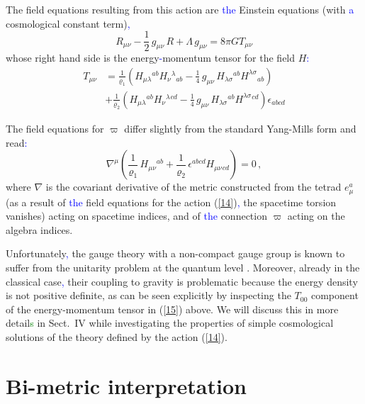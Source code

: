 \documentclass[prd,reprint,eqsecnum,nofootinbib]{revtex4-1}
\begin{document}
The field equations resulting from this action are \textcolor{blue}{the} Einstein
equations (with \textcolor{blue}{a} cosmological constant term)\textcolor{blue}{,}
\begin{equation}\label{15a}
    R_{\mu\nu}-\frac12\, g_{\mu\nu}\, R +\Lambda\, g_{\mu\nu}= 8\pi G T_{\mu\nu}
\end{equation}
whose right hand side is the energy\textcolor{blue}{-}momentum tensor for the field
$H$\textcolor{blue}{:}
\begin{align}
    T_{\mu\nu} &= \frac{1}{\varrho_1}\left(H_{\mu\lambda}{}^{ab} H_\nu{}^\lambda{}_{ab} -
    \frac14\, g_{\mu\nu}\,H_{\lambda\sigma}{}^{ab}
    H^{\lambda\sigma}{}_{ab}\right) \nonumber\\
    &+\frac{1}{\varrho_2}\left(H_{\mu\lambda}{}^{ab} H_\nu{}^\lambda{}^{cd} -
    \frac14\, g_{\mu\nu}\,H_{\lambda\sigma}{}^{ab}
    H^{\lambda\sigma}{}^{cd}\right)\epsilon_{abcd}\label{15}
\end{align}


The field equations for $\varpi$ differ slightly from the standard
Yang-Mills form and read\textcolor{blue}{:}
\begin{equation}\label{16}
    \nabla^\mu \left(\frac1{\varrho_1}\, H_{\mu\nu}{}^{ab} +\frac1{\varrho_2}\,\epsilon^{abcd}
    H_{\mu\nu}{}_{cd}\right)=0\,,
\end{equation}
where $\nabla$ is the covariant derivative of the metric constructed
from the tetrad $e^a_\mu$ (as a result of \textcolor{blue}{the} field equations for the
action (\ref{14})\textcolor{blue}{,} the spacetime torsion vanishes) acting on
spacetime indices, and of \textcolor{blue}{the} connection $\varpi$ acting on the algebra
indices.

Unfortunately\textcolor{blue}{,} the gauge theory with a non-compact gauge group is
known to suffer from the unitarity problem at the quantum level
\cite{Hsu:1980zt}. Moreover, already in the classical case\textcolor{blue}{,} their
coupling to gravity is problematic because the energy density is not
positive definite, as can be seen explicitly by inspecting the
$T_{00}$ component of the energy-momentum tensor in (\ref{15})
above. We will discuss this in more detail\textcolor{green}{s} in Sect.\ IV while
investigating the properties of simple cosmological solutions of the
theory defined by the action (\ref{14}).

\section{Bi-metric interpretation}
\end{document}
